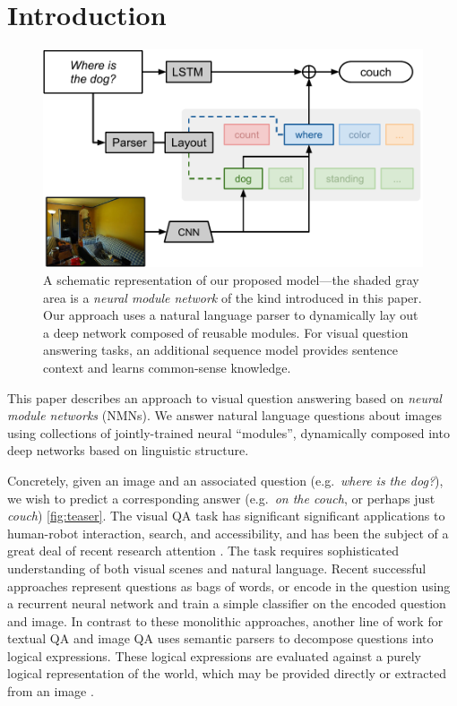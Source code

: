 \section{Introduction} 

\begin{figure}[t] \begin{center}
    \includegraphics[width=\linewidth]{fig/teaser} \end{center} \caption{
      A schematic representation of our proposed model---the shaded gray area is a
      {\it neural module network} of the kind introduced in this paper. Our
      approach uses a natural language parser to dynamically lay out a deep
      network composed of reusable modules. For visual question answering tasks,
      an additional sequence model provides sentence context and learns
      common-sense knowledge.
    } \label{fig:teaser}
\end{figure}

This paper describes an approach to visual question answering based on
\emph{neural module networks} (NMNs). We answer natural language questions about
images using collections of jointly-trained neural ``modules'', dynamically
composed into deep networks based on linguistic structure. 

Concretely, given an image and an associated question (e.g.\ \emph{where is
the dog?}), we wish to predict a corresponding answer (e.g.\ \emph{on the
couch}, or perhaps just \emph{couch}) \autoref{fig:teaser}.
The visual QA task has significant significant applications to human-robot
interaction, search, and accessibility, and has been the subject of a great deal
of recent research attention
\cite{antol15iccv,gao2015you,ma15arxiv,malinowski15iccv,ren2015image,yu15arxiv}.
The task requires sophisticated understanding of both visual
scenes and natural language.
%
 Recent successful approaches represent
questions as bags of words, or encode in the question using a recurrent neural
network \cite{malinowski15iccv} and train a simple classifier on the encoded
question and image. In contrast to these monolithic approaches, another line of
work for textual QA \cite{Liang13DCS} and image QA \cite{malinowski14nips} uses
semantic parsers to decompose questions into logical expressions. These logical
expressions are evaluated against a purely logical representation of the world,
which may be provided directly or extracted from an image
\cite{Krish2013Grounded}.

